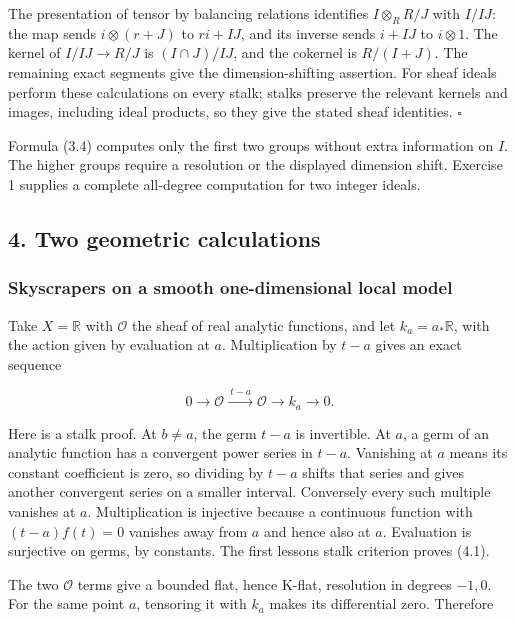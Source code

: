 \documentclass[
  english,
  11pt,
  a4paper,
]{article}
\begin{document}
The presentation of tensor by balancing relations identifies
\(I\otimes_R R/J\) with \(I/IJ\): the map sends \(i\otimes(r+J)\) to
\(ri+IJ\), and its inverse sends \(i+IJ\) to \(i\otimes1\). The kernel
of \(I/IJ\to R/J\) is \((I\cap J)/IJ\), and the cokernel is \(R/(I+J)\).
The remaining exact segments give the dimension-shifting assertion. For
sheaf ideals perform these calculations on every stalk; stalks preserve
the relevant kernels and images, including ideal products, so they give
the stated sheaf identities. \(\square\)

Formula (3.4) computes only the first two groups without extra
information on \(I\). The higher groups require a resolution or the
displayed dimension shift. Exercise 1 supplies a complete all-degree
computation for two integer ideals.

\subsection{4. Two geometric
calculations}\label{derived-tensor-products-and-tor-sheaves--4-two-geometric-calculations}

\subsubsection{Skyscrapers on a smooth one-dimensional local
model}\label{derived-tensor-products-and-tor-sheaves--skyscrapers-on-a-smooth-one-dimensional-local-model}

Take \(X=\mathbb R\) with \(\mathcal O\) the sheaf of real analytic
functions, and let \(k_a=a_*\mathbb R\), with the action given by
evaluation at \(a\). Multiplication by \(t-a\) gives an exact sequence

\[0\longrightarrow\mathcal O
\xrightarrow{\ t-a\ }\mathcal O
\longrightarrow k_a\longrightarrow0.
\tag{4.1}\]

Here is a stalk proof. At \(b\ne a\), the germ \(t-a\) is invertible. At
\(a\), a germ of an analytic function has a convergent power series in
\(t-a\). Vanishing at \(a\) means its constant coefficient is zero, so
dividing by \(t-a\) shifts that series and gives another convergent
series on a smaller interval. Conversely every such multiple vanishes at
\(a\). Multiplication is injective because a continuous function with
\((t-a)f(t)=0\) vanishes away from \(a\) and hence also at \(a\).
Evaluation is surjective on germs, by constants. The first
lesson\textquotesingle s stalk criterion proves (4.1).

The two \(\mathcal O\) terms give a bounded flat, hence K-flat,
resolution in degrees \(-1,0\). For the same point \(a\), tensoring it
with \(k_a\) makes its differential zero. Therefore
\end{document}
